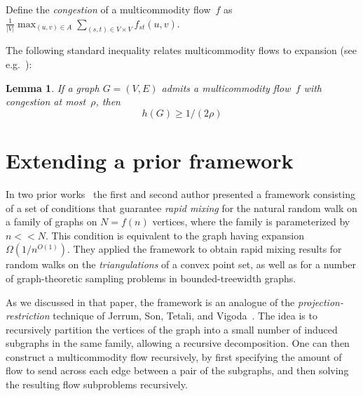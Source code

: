 \documentclass[
final
]{dmtcs-episciences}
\newtheorem{lemma}[theorem]{Lemma}
\begin{document}
Define the \emph{congestion} of a multicommodity flow~$f$ as $\frac{1}{|V|}\max_{(u, v) \in A}\sum_{(s, t) \in V \times V}f_{st}(u, v)$.

The following standard inequality relates multicommodity flows to expansion (see e.g.~\cite{sinclair_1992}):
\begin{lemma}
\label{lem:flowexp}
If a graph $G = (V, E)$ admits a multicommodity flow~$f$ with congestion at most~$\rho$, then
\[h(G) \geq 1/(2\rho)\]
\end{lemma}


\section{Extending a prior framework}
\label{sec:framework}
In two prior works~\citep{eppfrishtri, eppfrisharx} the first and second author presented a framework consisting of a set of conditions that guarantee \emph{rapid mixing} for the natural random walk on a family of graphs on $N = f(n)$ vertices, where the family is parameterized by $n << N$. This condition is equivalent to the graph having expansion $\Omega\left(1/n^{O(1)}\right)$. They applied the framework to obtain rapid mixing results for random walks on the \emph{triangulations} of a convex point set, as well as for a number of graph-theoretic sampling problems in bounded-treewidth graphs.

As we discussed in that paper, the framework is an analogue of the \emph{projection-restriction} technique of Jerrum, Son, Tetali, and Vigoda~\citep{jerrumprojres}. The idea is to recursively partition the vertices of the graph into a small number of induced subgraphs in the same family, allowing a recursive decomposition. One can then construct a multicommodity flow recursively, by first specifying the amount of flow to send across each edge between a pair of the subgraphs, and then solving the resulting flow subproblems recursively.
\end{document}
